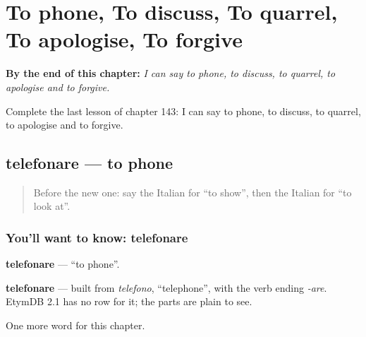 
\chapter{To phone, To discuss, To quarrel, To apologise, To forgive}
\label{ch:it-to-phone-to-discuss-to-quarrel-to-apologise-to-forgive}

\begin{chapteropening}
\textbf{By the end of this chapter:} \emph{I can say to phone, to discuss, to quarrel, to apologise and to forgive.}

Complete the last lesson of chapter 143: I can say to phone, to discuss, to quarrel, to apologise and to forgive.
\end{chapteropening}

\section[telefonare]{telefonare — to phone}

\label{lesson:IT-C143-telefonare}



\begin{quote}
Before the new one: say the Italian for \textquotedblleft{}to show\textquotedblright{}, then the Italian for \textquotedblleft{}to look at\textquotedblright{}.
\end{quote}

\subsection*{You'll want to know: telefonare}
\textbf{telefonare} — \textquotedblleft{}to phone\textquotedblright{}.

\begin{cousinweb}
\textbf{telefonare} — built from \emph{telefono}, \textquotedblleft{}telephone\textquotedblright{}, with the verb ending \emph{-are}. EtymDB 2.1 has no row for it; the parts are plain to see.
\end{cousinweb}

\begin{grammarlens}[title={What you've built}]
One more word for this chapter.
\end{grammarlens}

